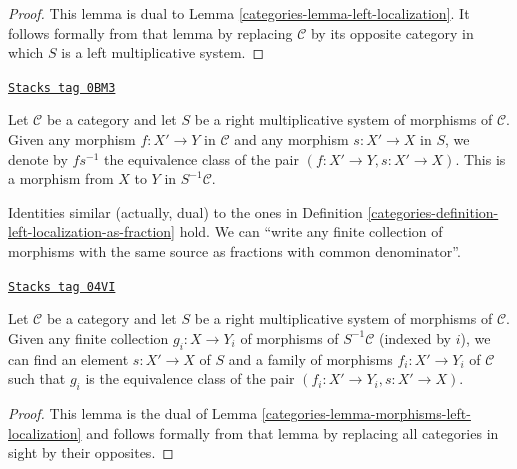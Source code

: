 \begin{proof}

This lemma is dual to
Lemma \ref{categories-lemma-left-localization}.
It follows formally from that lemma by replacing
$\mathcal{C}$ by its opposite category in which
$S$ is a left multiplicative system.
\end{proof}

\begin{definition}
\label{categories-definition-right-localization-as-fraction}
\href{https://stacks.math.columbia.edu/tag/0BM3}{\texttt{Stacks tag 0BM3}}

Let $\mathcal{C}$ be a category and let $S$ be a right multiplicative
system of morphisms of $\mathcal{C}$. Given any morphism
$f : X' \to Y$ in $\mathcal{C}$ and any morphism $s : X' \to X$ in
$S$, we denote by {\it $f s^{-1}$} the equivalence class of the pair
$(f : X' \to Y, s : X' \to X)$. This is a morphism from $X$ to $Y$
in $S^{-1} \mathcal{C}$.
\end{definition}

Identities similar (actually, dual) to the ones in Definition
\ref{categories-definition-left-localization-as-fraction} hold.
We can ``write any finite collection of morphisms with the same source
as fractions with common denominator''.

\begin{lemma}
\label{categories-lemma-morphisms-right-localization}
\href{https://stacks.math.columbia.edu/tag/04VI}{\texttt{Stacks tag 04VI}}

Let $\mathcal{C}$ be a category and let $S$ be a right multiplicative
system of morphisms of $\mathcal{C}$. Given any finite collection
$g_i : X \to Y_i$ of morphisms of $S^{-1}\mathcal{C}$
(indexed by $i$),
we can find an element $s : X' \to X$ of $S$ and a family
of morphisms $f_i : X' \to Y_i$ of $\mathcal{C}$ such that
$g_i$ is the equivalence class of the pair
$(f_i : X' \to Y_i, s : X' \to X)$.
\end{lemma}

\begin{proof}

This lemma is the dual of
Lemma \ref{categories-lemma-morphisms-left-localization}
and follows formally from that lemma by replacing all
categories in sight by their opposites.
\end{proof}


